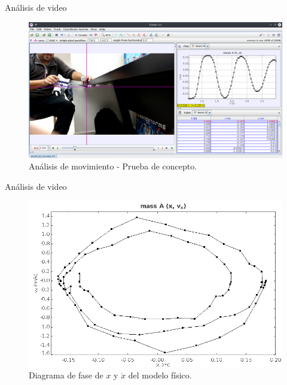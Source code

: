 \documentclass{beamer}
\begin{document}
\begin{frame}{Análisis de video}
 \begin{figure}[h]
 \centering
 \includegraphics[scale=0.2]{../Report/img/tracker_poc.png}
 \caption{Análisis de movimiento - Prueba de concepto.}
 \label{fig: tracker main window}
\end{figure}

\end{frame}

\begin{frame}{Análisis de video}
 \begin{figure}[h]
 \centering
 \includegraphics[scale=0.2]{../Report/img/tracker_poc_phasediagram_x_vx.png}
 \caption{Diagrama de fase de $x$ y $\dot{x}$ del modelo físico.}
 \label{fig: tracker phase diagram x vx}
\end{figure}

\end{frame}
\end{document}
